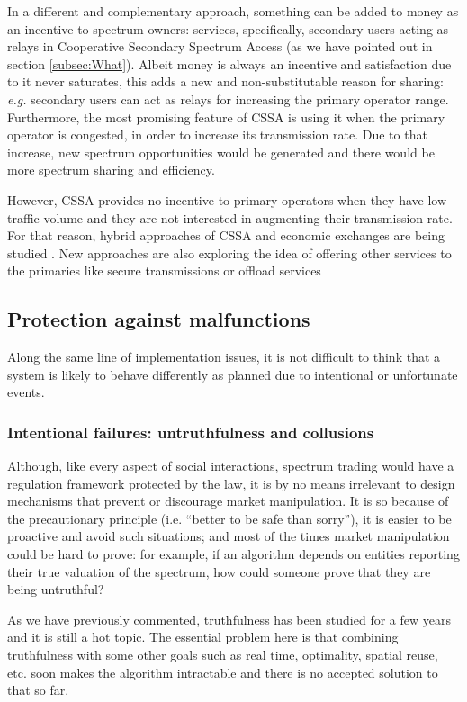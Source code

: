 In a different and complementary approach, something can be added to money as an incentive to spectrum owners: services, specifically, secondary users acting as relays in Cooperative Secondary Spectrum Access (as we have pointed out in section \ref{subsec:What}). 
Albeit money is always an incentive and satisfaction due to it never saturates, this adds a new and non-substitutable reason for sharing: \textit{e.g.} secondary users can act as relays for increasing the primary operator range. 
Furthermore, the most promising feature of CSSA is using it when the primary operator is congested, in order to increase its transmission rate. 
Due to that increase, new spectrum opportunities would be generated and there would be more spectrum sharing and efficiency. 

However, CSSA provides no incentive to primary operators when they have low traffic volume and they are not interested in augmenting their transmission rate.
For that reason, hybrid approaches of CSSA and economic exchanges are being studied \cite{ref:Zhang2012_Fair,ref:Zhang2009}. 
New approaches are also exploring the idea of offering other services to the primaries like secure transmissions \cite{ref:Lee2011} or offload services \cite{ref:Pantisano,ref:Yi}

\subsection{Protection against malfunctions}
Along the same line of implementation issues, it is not difficult to think that a system is likely to behave differently as planned due to intentional or unfortunate events.
\subsubsection{Intentional failures: untruthfulness and collusions}
Although, like every aspect of social interactions, spectrum trading would have a regulation framework protected by the law, it is by no means irrelevant to design mechanisms that prevent or discourage market manipulation. It is so because of the precautionary principle (i.e. ``better to be safe than sorry''), it is easier to be proactive and avoid such situations; and most of the times market manipulation could be hard to prove: for example, if an algorithm depends on entities reporting their true valuation of the spectrum, how could someone prove that they are being untruthful?

As we have previously commented, truthfulness has been studied for a few years and it is still a hot topic. The essential problem here is that combining truthfulness with some other goals such as real time, optimality, spatial reuse, etc. soon makes the algorithm intractable and there is no accepted solution to that so far.

